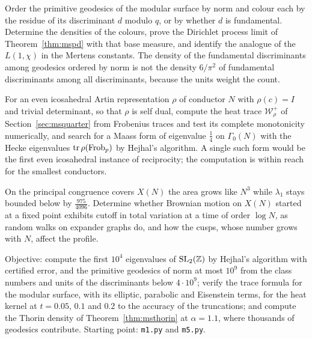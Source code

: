 \begin{problem}\label{op:mschebotarev}
Order the primitive geodesics of the modular surface by norm and colour each by the residue of its discriminant $d$ modulo $q$, or by whether $d$ is fundamental. Determine the densities of the colours, prove the Dirichlet process limit of Theorem~\ref{thm:mspd} with that base measure, and identify the analogue of the $L(1,\chi)$ in the Mertens constants. The density of the fundamental discriminants among geodesics ordered by norm is not the density $6/\pi^2$ of fundamental discriminants among all discriminants, because the units weight the count.
\end{problem}

\begin{problem}\label{op:mseven}
For an even icosahedral Artin representation $\rho$ of conductor $N$ with $\rho(c)=I$ and trivial determinant, so that $\rho$ is self dual, compute the heat trace $\mathcal W^+_\rho$ of Section~\ref{sec:msquarter} from Frobenius traces and test its complete monotonicity numerically, and search for a Maass form of eigenvalue $\frac14$ on $\Gamma_0(N)$ with the Hecke eigenvalues $\operatorname{tr}\rho(\operatorname{Frob}_p)$ by Hejhal's algorithm. A single such form would be the first even icosahedral instance of reciprocity; the computation is within reach for the smallest conductors.
\end{problem}

\begin{problem}\label{op:mscutoff}
On the principal congruence covers $X(N)$ the area grows like $N^3$ while $\lambda_1$ stays bounded below by $\frac{975}{4096}$. Determine whether Brownian motion on $X(N)$ started at a fixed point exhibits cutoff in total variation at a time of order $\log N$, as random walks on expander graphs do, and how the cusps, whose number grows with $N$, affect the profile.
\end{problem}

\begin{compproblem}\label{cp:msspectrum}
Objective: compute the first $10^4$ eigenvalues of $\mathrm{SL}_2(\mathbb{Z})$ by Hejhal's algorithm with certified error, and the primitive geodesics of norm at most $10^{9}$ from the class numbers and units of the discriminants below $4\cdot10^9$; verify the trace formula for the modular surface, with its elliptic, parabolic and Eisenstein terms, for the heat kernel at $t=0.05$, $0.1$ and $0.2$ to the accuracy of the truncations; and compute the Thorin density of Theorem~\ref{thm:msthorin} at $\alpha=1.1$, where thousands of geodesics contribute. Starting point: \texttt{m1.py} and \texttt{m5.py}.
\end{compproblem}
